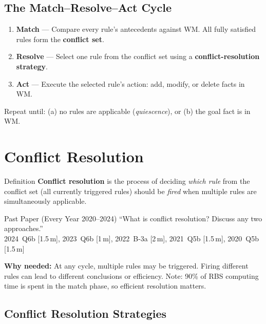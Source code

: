 \documentclass[12pt,a4paper]{article}
\begin{document}
\subsection{The Match--Resolve--Act Cycle}

\begin{enumerate}[itemsep=5pt]
  \item \textbf{Match} --- Compare every rule's antecedents against WM.
        All fully satisfied rules form the \textbf{conflict set}.
  \item \textbf{Resolve} --- Select one rule from the conflict set using a
        \textbf{conflict-resolution strategy}.
  \item \textbf{Act} --- Execute the selected rule's action: add, modify, or delete facts in WM.
\end{enumerate}

Repeat until: (a) no rules are applicable (\emph{quiescence}), or (b) the goal fact is in WM.

\section{Conflict Resolution}

\begin{defbox}{Definition}
\textbf{Conflict resolution} is the process of deciding \emph{which rule} from the conflict set
(all currently triggered rules) should be \emph{fired} when multiple rules are simultaneously applicable.
\end{defbox}

\begin{exambox}{Past Paper (Every Year 2020--2024)}
``What is conflict resolution? Discuss any two approaches.''\\
2024~Q6b [1.5\,m], 2023~Q6b [1\,m], 2022~B-3a [2\,m], 2021~Q5b [1.5\,m], 2020~Q5b [1.5\,m]
\end{exambox}

\textbf{Why needed:} At any cycle, multiple rules may be triggered.
Firing different rules can lead to different conclusions or efficiency.
Note: 90\% of RBS computing time is spent in the match phase, so efficient resolution matters.

\subsection{Conflict Resolution Strategies}
\end{document}
